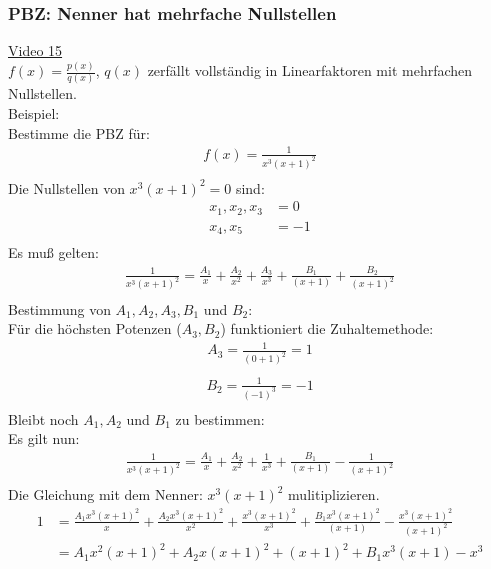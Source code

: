 \subsubsection{PBZ: Nenner hat mehrfache Nullstellen}
\href{https://youtu.be/4sYdi6gqWZo}{Video 15}\\
$ f(x)=\frac{p(x)}{q(x)} $, $ q(x) $ zerfällt vollständig in Linearfaktoren mit mehrfachen Nullstellen.\\
Beispiel:\\
Bestimme die PBZ für:\\
\begin{align*}
f(x)=\frac{1}{x^3(x+1)^2}\\
\end{align*}
Die Nullstellen von $ x^3(x+1)^2 =0$ sind:\\
\begin{align*}
x_1, x_2, x_3& = 0\\
x_4, x_5& = -1\\
\end{align*}
Es muß gelten:\\
\begin{align*}
\frac{1}{x^3(x+1)^2}=\frac{A_1}{x}+\frac{A_2}{x^2}+\frac{A_3}{x^3}+\frac{B_1}{(x+1)}+\frac{B_2}{(x+1)^2}\\
\end{align*}
Bestimmung von $ A_1, A_2, A_3, B_1$ und $B_2$:\\
Für die höchsten Potenzen ($ A_3, B_2 $) funktioniert die Zuhaltemethode:\\
\begin{align*}
A_3=\frac{1}{(0+1)^2}=1\\
\end{align*}
\begin{align*}
B_2=\frac{1}{(-1)^3}=-1\\
\end{align*}
Bleibt noch $ A_1, A_2 $ und $ B_1 $ zu bestimmen:\\
Es gilt nun:\\
\begin{align*}
\frac{1}{x^3(x+1)^2}=\frac{A_1}{x}+\frac{A_2}{x^2}+\frac{1}{x^3}+\frac{B_1}{(x+1)}-\frac{1}{(x+1)^2}\\
\end{align*}
Die Gleichung mit dem Nenner: $ x^3(x+1)^2 $ mulitiplizieren.\\
\begin{align*}
1&=\frac{A_1x^3(x+1)^2}{x}+\frac{A_2x^3(x+1)^2}{x^2}+\frac{x^3(x+1)^2}{x^3}+\frac{B_1x^3(x+1)^2}{(x+1)}-\frac{x^3(x+1)^2}{(x+1)^2}\\
&=A_1x^2(x+1)^2 +A_2x(x+1)^2+(x+1)^2+B_1x^3(x+1)-x^3\\
\end{align*}

